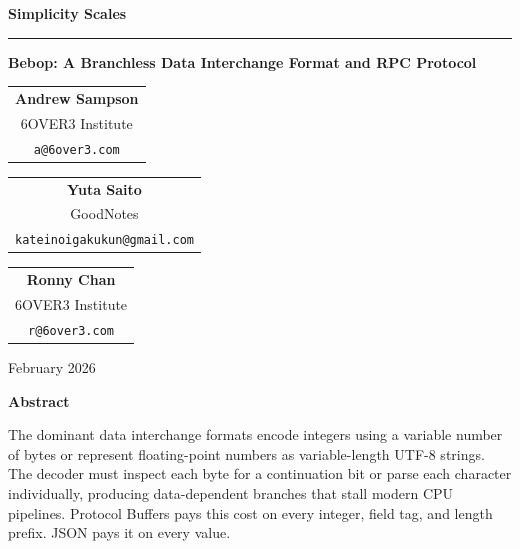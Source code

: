\documentclass[10pt,onecolumn]{article}
\begin{document}
\thispagestyle{plain}

\vspace*{0.15in}

\begin{center}

{\fontsize{24}{28}\selectfont\sffamily\bfseries Simplicity Scales}

\vspace{0.06in}

\rule{\textwidth}{0.8pt}

\vspace{0.1in}

{\large\sffamily\bfseries Bebop: A Branchless Data Interchange Format and RPC Protocol}

\vspace{0.15in}

\begin{tabular}[t]{c}
\textbf{Andrew Sampson} \\[2pt]
6OVER3 Institute \\[1pt]
\texttt{a@6over3.com}
\end{tabular}%
\hfill
\begin{tabular}[t]{c}
\textbf{Yuta Saito} \\[2pt]
GoodNotes \\[1pt]
\texttt{kateinoigakukun@gmail.com}
\end{tabular}%
\hfill
\begin{tabular}[t]{c}
\textbf{Ronny Chan} \\[2pt]
6OVER3 Institute \\[1pt]
\texttt{r@6over3.com}
\end{tabular}

\vspace{0.1in}

{\normalsize February 2026}

\end{center}

\vspace{0.1in}

\begin{center}
{\sffamily\normalsize\bfseries Abstract}
\end{center}

\vspace{0.03in}

\noindent The dominant data interchange formats encode integers using a variable number of bytes or represent floating-point numbers as variable-length UTF-8 strings. The decoder must inspect each byte for a continuation bit or parse each character individually, producing data-dependent branches that stall modern CPU pipelines. Protocol Buffers pays this cost on every integer, field tag, and length prefix. JSON pays it on every value.
\end{document}

